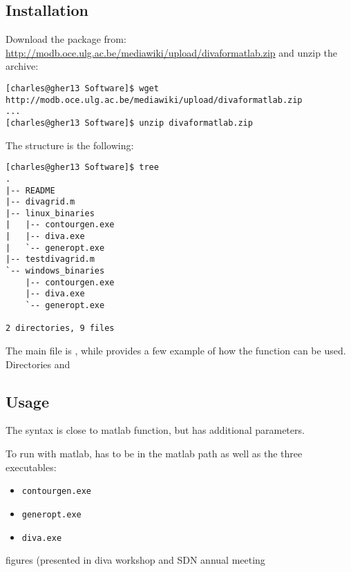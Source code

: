 \subsection{Installation}

Download the package from: \url{http://modb.oce.ulg.ac.be/mediawiki/upload/divaformatlab.zip}
and unzip the archive:
\begin{lstlisting}[style=Bash]
[charles@gher13 Software]$ wget http://modb.oce.ulg.ac.be/mediawiki/upload/divaformatlab.zip
...
[charles@gher13 Software]$ unzip divaformatlab.zip
\end{lstlisting}

The structure is the following:
\begin{lstlisting}[style=Bash]
[charles@gher13 Software]$ tree
.
|-- README
|-- divagrid.m
|-- linux_binaries
|   |-- contourgen.exe
|   |-- diva.exe
|   `-- generopt.exe
|-- testdivagrid.m
`-- windows_binaries
    |-- contourgen.exe
    |-- diva.exe
    `-- generopt.exe

2 directories, 9 files
\end{lstlisting}

The main file is , while  provides a few example of how the function can be used.
Directories  and  
 
\subsection{Usage}

The syntax  is close to matlab  function, but has additional parameters.

To run \diva with matlab,  has to be in the matlab path as well as the three executables:
\begin{itemize}
\item \texttt{contourgen.exe}
\item \texttt{generopt.exe}
\item \texttt{diva.exe}
\end{itemize}


figures (presented in diva workshop and SDN annual meeting
